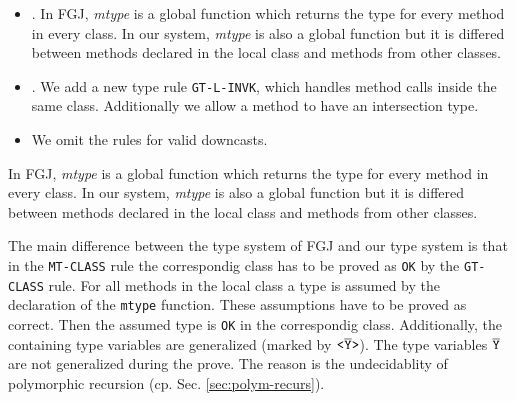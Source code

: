 \begin{itemize}
\item {}.
  In FGJ, \textit{mtype} is a global function which returns the type for every method in every class.
  In our system, \textit{mtype} is also a global function but it is differed between
  methods declared in the local class and methods from other classes.
\item {}.
We add a new type rule \texttt{GT-L-INVK}, which handles method calls inside the same class.
Additionally we allow a method to have an intersection type.
\item We omit the rules for valid downcasts.


\end{itemize}

In FGJ, \textit{mtype} is a global function which returns the type for every method in every class.
In our system, \textit{mtype} is also a global function but it is differed between
methods declared in the local class and methods from other classes.

The main difference between the type system of FGJ and our type system is that
in the \texttt{MT-CLASS} rule the correspondig class has to be proved as \texttt{OK}
by the \texttt{GT-CLASS} rule.
For all methods in the local class a type is assumed by the declaration of the \texttt{mtype} function.
These assumptions have to be proved as correct. Then the assumed type is
\texttt{OK} in the correspondig class. Additionally, the containing type
variables are generalized (marked by $\mathtt{ \texttt{<} \overline{\tt Y} \texttt{>} }$). The type variables
$\overline{\tt \mathtt{Y}}$ are not generalized during the prove. The reason is the
undecidablity of polymorphic recursion (cp. Sec. \ref{sec:polym-recurs}).

